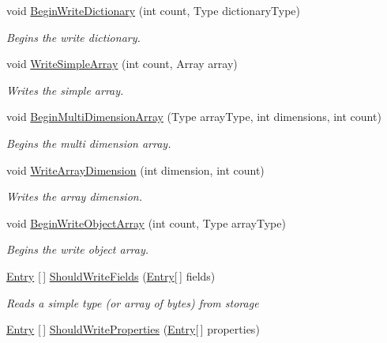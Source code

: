 \begin{DoxyCompactItemize}
void \hyperlink{class_serialization_1_1_binary_serializer_afd9aec76b7b20ab88a9e3caca7470c8b}{Begin\+Write\+Dictionary} (int count, Type dictionary\+Type)
\begin{DoxyCompactList}\small\item\em Begins the write dictionary. \end{DoxyCompactList}\item 
void \hyperlink{class_serialization_1_1_binary_serializer_ad694b37d2693fb305f569bebe076b9f8}{Write\+Simple\+Array} (int count, Array array)
\begin{DoxyCompactList}\small\item\em Writes the simple array. \end{DoxyCompactList}\item 
void \hyperlink{class_serialization_1_1_binary_serializer_acbd47a7b1720dff38a36f4c645fe0df7}{Begin\+Multi\+Dimension\+Array} (Type array\+Type, int dimensions, int count)
\begin{DoxyCompactList}\small\item\em Begins the multi dimension array. \end{DoxyCompactList}\item 
void \hyperlink{class_serialization_1_1_binary_serializer_adf00734419149ffd0f8999876c1120b0}{Write\+Array\+Dimension} (int dimension, int count)
\begin{DoxyCompactList}\small\item\em Writes the array dimension. \end{DoxyCompactList}\item 
void \hyperlink{class_serialization_1_1_binary_serializer_ab5c4d7c504b6766c9a1e7ee217ddfce6}{Begin\+Write\+Object\+Array} (int count, Type array\+Type)
\begin{DoxyCompactList}\small\item\em Begins the write object array. \end{DoxyCompactList}\item 
\hyperlink{class_serialization_1_1_entry}{Entry} \mbox{[}$\,$\mbox{]} \hyperlink{class_serialization_1_1_binary_serializer_a1813abad4bdfe9607f093e4df66a4414}{Should\+Write\+Fields} (\hyperlink{class_serialization_1_1_entry}{Entry}\mbox{[}$\,$\mbox{]} fields)
\begin{DoxyCompactList}\small\item\em Reads a simple type (or array of bytes) from storage \end{DoxyCompactList}\item 
\hyperlink{class_serialization_1_1_entry}{Entry} \mbox{[}$\,$\mbox{]} \hyperlink{class_serialization_1_1_binary_serializer_adb05a4a6e028617fe748ae28dc97d7c7}{Should\+Write\+Properties} (\hyperlink{class_serialization_1_1_entry}{Entry}\mbox{[}$\,$\mbox{]} properties)

\end{DoxyCompactItemize}
